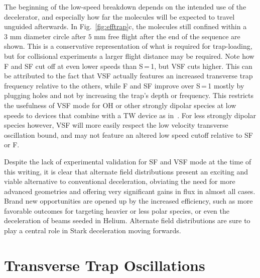 The beginning of the low-speed breakdown depends on the intended use of the decelerator, and especially how far the molecules will be expected to travel unguided afterwards. 
In Fig.~\ref{fig:efftrap}c, the molecules still confined within a $3\text{ mm}$ diameter circle after $5\text{ mm}$ free flight after the end of the sequence are shown. 
This is a conservative representation of what is required for trap-loading, but for collisional experiments a larger flight distance may be required.
Note how F and SF cut off at even lower speeds than S\,=\,1, but VSF cuts higher. 
This can be attributed to the fact that VSF actually features an increased transverse trap frequency relative to the others, while F and SF improve over S\,=\,1 mostly by plugging holes and not by increasing the trap's depth or frequency.
This restricts the usefulness of VSF mode for OH or other strongly dipolar species at low speeds to devices that combine with a TW device as in~\cite{Quintero-Perez2013}.
For less strongly dipolar species however, VSF will more easily respect the low velocity transverse oscillation bound, and may not feature an altered low speed cutoff relative to SF or F.

Despite the lack of experimental validation for SF and VSF mode at the time of this writing, it is clear that alternate field distributions present an exciting and viable alternative to conventional deceleration, obviating the need for more advanced geometries and offering very significant gains in flux in almost all cases.
Brand new opportunities are opened up by the increased efficiency, such as more favorable outcomes for targeting heavier or less polar species, or even the deceleration of beams seeded in Helium.
Alternate field distributions are sure to play a central role in Stark deceleration moving forwards.

\section{Transverse Trap Oscillations}\label{ttosec}

